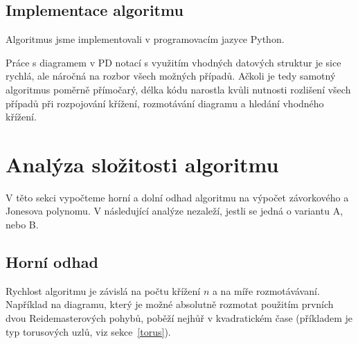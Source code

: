 \subsection{Implementace algoritmu}
Algoritmus jsme implementovali v programovacím jazyce Python. 

Práce s diagramem v PD notací s využitím vhodných datových struktur je sice rychlá, ale náročná na rozbor všech možných případů. Ačkoli je tedy samotný algoritmus poměrně přímočarý, délka kódu narostla kvůli nutnosti rozlišení všech případů při rozpojování křížení, rozmotávání diagramu a hledání vhodného křížení.

\section{Analýza složitosti algoritmu}  \label{analyza}
V těto sekci vypočteme horní a dolní odhad algoritmu na výpočet závorkového a Jonesova polynomu. V následující analýze nezaleží, jestli se jedná o variantu A, nebo B.
\subsection{Horní odhad}
Rychlost algoritmu je závislá na počtu křížení $n$ a na míře rozmotávávaní. Například na diagramu, který je možné absolutně rozmotat použitím prvních dvou Reidemasterových pohybů, poběží nejhůř v kvadratickém čase (příkladem je typ torusových uzlů, viz sekce~\ref{torus}).

